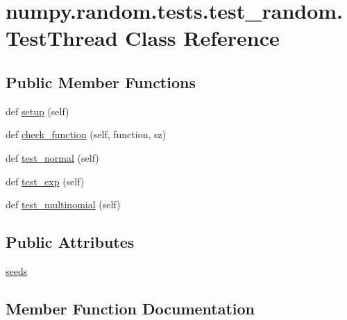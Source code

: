 \hypertarget{classnumpy_1_1random_1_1tests_1_1test__random_1_1TestThread}{}\section{numpy.\+random.\+tests.\+test\+\_\+random.\+Test\+Thread Class Reference}
\label{classnumpy_1_1random_1_1tests_1_1test__random_1_1TestThread}
\subsection*{Public Member Functions}
\begin{DoxyCompactItemize}
\item 
def \hyperlink{classnumpy_1_1random_1_1tests_1_1test__random_1_1TestThread_a713e0fa40266bcddeba502dfe0b14b16}{setup} (self)
\item 
def \hyperlink{classnumpy_1_1random_1_1tests_1_1test__random_1_1TestThread_a2b09ea7eeba571dbd75eed1e63cc1543}{check\+\_\+function} (self, function, sz)
\item 
def \hyperlink{classnumpy_1_1random_1_1tests_1_1test__random_1_1TestThread_acd6834b9e01f28348474fcb38f3216af}{test\+\_\+normal} (self)
\item 
def \hyperlink{classnumpy_1_1random_1_1tests_1_1test__random_1_1TestThread_a772a99d1cfb0acb81a083b63b35384dc}{test\+\_\+exp} (self)
\item 
def \hyperlink{classnumpy_1_1random_1_1tests_1_1test__random_1_1TestThread_ac27d40eb52292c794e8180e9dcb73b94}{test\+\_\+multinomial} (self)
\end{DoxyCompactItemize}
\subsection*{Public Attributes}
\begin{DoxyCompactItemize}
\item 
\hyperlink{classnumpy_1_1random_1_1tests_1_1test__random_1_1TestThread_aeccbf630b5b2a6b9321dc5ae65a47824}{seeds}
\end{DoxyCompactItemize}


\subsection{Member Function Documentation}
\mbox{\label{classnumpy_1_1random_1_1tests_1_1test__random_1_1TestThread_a2b09ea7eeba571dbd75eed1e63cc1543}} 
